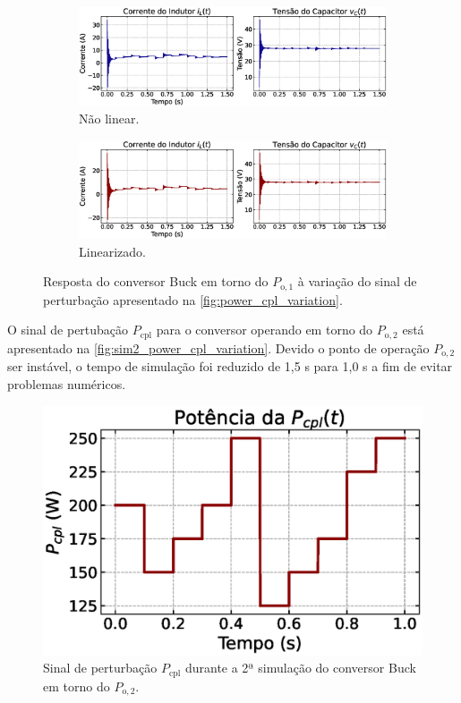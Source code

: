 \begin{figure}[H]
  \centering
  \captionsetup{justification=centering}
  \begin{subfigure}{1.\textwidth}
    \centering
    \includegraphics[width=1.\textwidth]{figuras/buck/sim2/op1/result_nonlinear.eps}
    \caption{Não linear.}
    \label{fig:simulation2_op1_nonlinear}
  \end{subfigure}
  \newline
  \begin{subfigure}{1.\textwidth}
    \centering
    \includegraphics[width=1.\textwidth]{figuras/buck/sim2/op1/result_linear.eps}
    \caption{Linearizado.}
    \label{fig:simulation2_op1_linear}
  \end{subfigure}
  \caption{Resposta do conversor Buck em torno do $P_{\mathrm{o}, 1}$ à variação do sinal de perturbação apresentado na \autoref{fig:power_cpl_variation}.}
  \label{fig:simulation2_op1}
\end{figure}

O sinal de pertubação $P_{\mathrm{cpl}}$ para o conversor operando em torno do $P_{\mathrm{o}, 2}$ está apresentado na \autoref{fig:sim2_power_cpl_variation}. Devido o ponto de operação $P_{\mathrm{o}, 2}$ ser instável, o tempo de simulação foi reduzido de 1,5 s para 1,0 s a fim de evitar problemas numéricos.

\begin{figure}[H]
  \centering
  \captionsetup{justification=centering}
  \includegraphics[width=.5\textwidth]{figuras/buck/sim2/op2/power_cpl_variation.eps}
  \caption{Sinal de perturbação $P_{\mathrm{cpl}}$ durante a 2ª simulação do conversor Buck em torno do $P_{\mathrm{o}, 2}$.}
  \label{fig:sim2_power_cpl_variation}
\end{figure}

